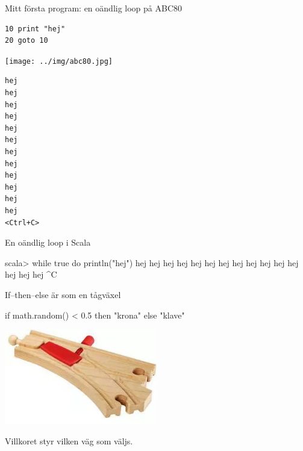 \ifkompendium\else
\begin{SlideExtra}{Mitt första program: en oändlig loop på ABC80}
\begin{minipage}{0.8\textwidth}
\begin{verbatim}
10 print "hej"
20 goto 10
\end{verbatim}
\texttt{[image: ../img/abc80.jpg]}
\end{minipage}%
\begin{minipage}{0.2\textwidth}
\pause
\begin{verbatim}
hej
hej
hej
hej
hej
hej
hej
hej
hej
hej
hej
hej
<Ctrl+C>
\end{verbatim}
\end{minipage}

\end{SlideExtra}
\begin{SlideExtra}{En oändlig loop i Scala}
  \begin{REPLnonum}
scala> while true do println("hej")
hej
hej
hej
hej
hej
hej
hej
hej
hej
hej
hej
hej
hej
hej
hej
^C
\end{REPLnonum}
\end{SlideExtra}

\begin{SlideExtra}{If--then--else är som en tågväxel}
\begin{Code}
if math.random() < 0.5 then "krona" else "klave"
\end{Code}
\begin{minipage}{0.8\textwidth}
\hspace{2em}\includegraphics[width=0.5\textwidth]{../img/vaxel.jpg}
\end{minipage}

\vspace{1em}Villkoret styr vilken väg som väljs.
\end{SlideExtra}

\fi

